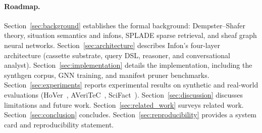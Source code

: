 \paragraph{Roadmap.}
Section~\ref{sec:background} establishes the formal background: Dempster--Shafer
theory, situation semantics and infons, SPLADE sparse retrieval, and sheaf
graph neural networks.
Section~\ref{sec:architecture} describes Infon's four-layer architecture
(cassette substrate, query DSL, reasoner, and conversational analyst).
Section~\ref{sec:implementation} details the implementation, including the
synthgen corpus, GNN training, and manifest pruner benchmarks.
Section~\ref{sec:experiments} reports experimental results on synthetic and
real-world evaluations (HoVer~\cite{jiang2020hover},
AVeriTeC~\cite{schlichtkrull2023averitec},
SciFact~\cite{wadden2020scifact}).
Section~\ref{sec:discussion} discusses limitations and future work.
Section~\ref{sec:related_work} surveys related work.
Section~\ref{sec:conclusion} concludes.
Section~\ref{sec:reproducibility} provides a system card and reproducibility
statement.
